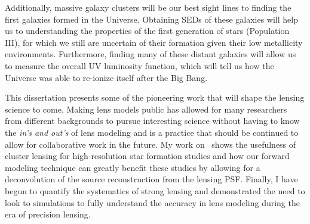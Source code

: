 Additionally, massive galaxy clusters will be our best sight lines to finding the first galaxies formed in the Universe. Obtaining SEDs of these galaxies will help us to understanding the properties of the first generation of stars (Population III), for which we still are uncertain of their formation given their low metallicity environments. Furthermore, finding many of these distant galaxies will allow us to measure the overall UV luminosity function, which will tell us how the Universe was able to re-ionize itself after the Big Bang.

This dissertation presents some of the pioneering work that will shape the lensing science to come. Making lens models public has allowed for many researchers from different backgrounds to pursue interesting science without having to know the {\it in's and out's} of lens modeling and is a practice that should be continued to allow for collaborative work in the future. My work on \giantarc\ shows the usefulness of cluster lensing for high-resolution star formation studies and how our forward modeling technique can greatly benefit these studies by allowing for a deconvolution of the source reconstruction from the lensing PSF. Finally, I have begun to quantify the systematics of strong lensing and demonstrated the need to look to simulations to fully understand the accuracy in lens modeling during the era of precision lensing.


